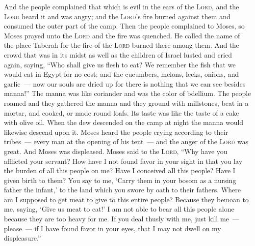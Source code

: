 
\begin{inparaenum}
   And the people complained that which is evil in the ears of the \textsc{Lord}, and the \textsc{Lord} heard it and was angry; and the \textsc{Lord}'s fire burned against them and consumed the outer part of the camp.%
   Then the people complained to Moses, so Moses prayed unto the \textsc{Lord} and the fire was quenched.%
   He called the name of the place Taberah for the fire of the \textsc{Lord} burned there among them.%
   And the crowd that was in its midst as well as the children of Israel lusted and cried again, saying, ``Who shall give us flesh to eat?%
   We remember the fish that we would eat in Egypt for no cost; and the cucumbers, melons, leeks, onions, and garlic~---%
   now our souls are dried up for there is nothing that we can see besides manna!''%
   The manna was like coriander and was the color of bdellium.%
   The people roamed and they gathered the manna and they ground with millstones, beat in a mortar, and cooked, or made round loafs. Its taste was like the taste of a cake with olive oil.%
   When the dew descended on the camp at night the manna would likewise descend upon it.%
   Moses heard the people crying according to their tribes~--- every man at the opening of his tent~--- and the anger of the \textsc{Lord} was great. And Moses was displeased.%
   Moses said to the \textsc{Lord}, ``Why have you afflicted your servant? How have I not found favor in your sight in that you lay the burden of all this people on me?%
   Have I conceived all this people? Have I given birth to them? You say to me, `Carry them in your bosom as a nursing father the infant,' to the land which you swore by oath to their fathers.%
   Where am I supposed to get meat to give to this entire people? Because they bemoan to me, saying, `Give us meat to eat!'%
   I am not able to bear all this people alone because they are too heavy for me.%
   If you deal thusly with me, just kill me~--- please~--- if I have found favor in your eyes, that I may not dwell on my displeasure.''%
  

\end{inparaenum}

